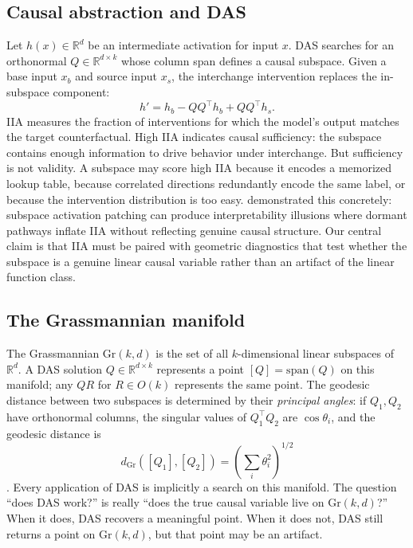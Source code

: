 \documentclass{article}
\newcommand{\Gr}{\mathrm{Gr}}
\newcommand{\R}{\mathbb{R}}
\newcommand{\dgr}{d_{\Gr}}
\newcommand{\Span}{\mathrm{span}}
\begin{document}
\subsection{Causal abstraction and DAS}

Let $h(x) \in \R^d$ be an intermediate activation for input $x$. DAS searches
for an orthonormal $Q \in \R^{d \times k}$ whose column span defines a causal
subspace. Given a base input $x_b$ and source input $x_s$, the interchange
intervention replaces the in-subspace component:
\begin{equation}
h' = h_b - QQ^\top h_b + QQ^\top h_s .
\label{eq:intervention}
\end{equation}
IIA measures the fraction of interventions for which the model's output matches
the target counterfactual. High IIA indicates causal sufficiency: the subspace
contains enough information to drive behavior under interchange. But sufficiency
is not validity. A subspace may score high IIA because it encodes a memorized
lookup table, because correlated directions redundantly encode the same label, or
because the intervention distribution is too easy.
\citet{makelov2024illusion} demonstrated this concretely: subspace activation
patching can produce interpretability illusions where dormant pathways inflate IIA
without reflecting genuine causal structure. Our central claim is that IIA must be
paired with geometric diagnostics that test whether the subspace is a genuine
linear causal variable rather than an artifact of the linear function class.

\subsection{The Grassmannian manifold}
\label{sec:grassmannian_background}

The Grassmannian $\Gr(k,d)$ is the set of all $k$-dimensional linear subspaces
of $\R^d$. A DAS solution $Q \in \R^{d \times k}$ represents a point
$[Q] = \Span(Q)$ on this manifold; any $QR$ for $R \in O(k)$ represents the
same point. The geodesic distance between two subspaces is determined by their
\emph{principal angles}: if $Q_1, Q_2$ have orthonormal columns, the singular
values of $Q_1^\top Q_2$ are $\cos \theta_i$, and the geodesic distance is
\begin{equation}
\dgr([Q_1],[Q_2]) = \left(\sum_i \theta_i^2\right)^{1/2}
\label{eq:geodesic}
\end{equation}
\citep{edelman1998geometry, absil2008optimization}. Every application of DAS is
implicitly a search on this manifold. The question ``does DAS work?'' is
really ``does the true causal variable live on $\Gr(k,d)$?'' When it does, DAS
recovers a meaningful point. When it does not, DAS still returns a point on
$\Gr(k,d)$, but that point may be an artifact.
\end{document}
